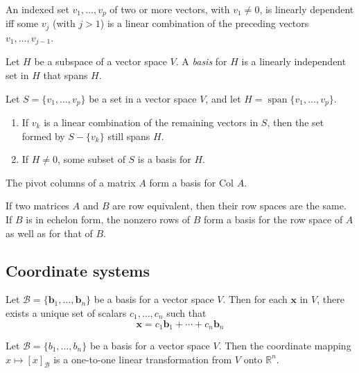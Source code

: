 \documentclass{article}
\DeclareMathOperator{\spn}{span}
\begin{document}
\begin{thm}
    An indexed set \(v_1,\ldots,v_p\) of two or more vectors, with \(v_1\neq0\), is linearly dependent iff some \(v_j\) (with \(j>1\)) is a linear combination of the preceding vectors \(v_1,\ldots,v_{j-1}\).
\end{thm}

\begin{defn}
    Let \(H\) be a subspace of a vector space \(V\). A \emph{basis} for \(H\) is a linearly independent set in \(H\) that spans \(H\).
\end{defn}

\begin{thm} 
    Let \(S=\{v_1,\ldots,v_p\}\) be a set in a vector space \(V\), and let \(H=\spn\{v_1,\ldots,v_p\}\).
    \begin{enumerate}
        \item[a.] If \(v_k\) is a linear combination of the remaining vectors in \(S\), then the set formed by \(S-\{v_k\}\) still spans \(H\).
        \item[b.] If \(H\neq0\), some subset of \(S\) is a basis for \(H\).
    \end{enumerate}
\end{thm}

\begin{thm}
    The pivot columns of a matrix \(A\) form a basis for \(\text{Col }A\).
\end{thm}

\begin{thm}
    If two matrices \(A\) and \(B\) are row equivalent, then their row spaces are the same. If \(B\) is in echelon form, the nonzero rows of \(B\) form a basis for the row space of \(A\) as well as for that of \(B\).
\end{thm}

\subsection{Coordinate systems}

\begin{thm} 
    Let \(\mathcal{B}=\{\textbf{b}_1,\ldots,\textbf{b}_n\}\) be a basis for a vector space \(V\). Then for each \(\textbf{x}\) in \(V\), there exists a unique set of scalars \(c_1,\ldots,c_n\) such that \[\textbf{x}=c_1\textbf{b}_1+\cdots+c_n\textbf{b}_n\]
\end{thm}

\begin{thm}
    Let \(\mathcal{B}=\{b_1,\ldots,b_n\}\) be a basis for a vector space \(V\). Then the coordinate mapping \(x\mapsto\left[x\right]_{\mathcal{B}}\) is a one-to-one linear transformation from \(V\) onto \(\mathbb{R}^n\).
\end{thm}
\end{document}
